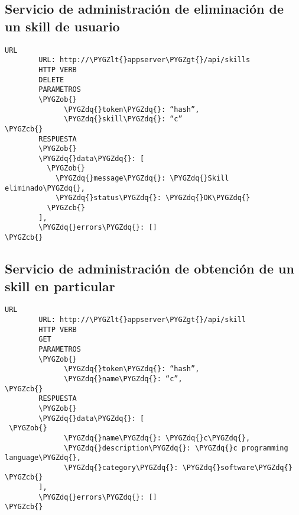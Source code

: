 \documentclass[a4paper,10pt,spanish]{sphinxmanual}
\def\PYGZob{\char`\{}
\def\PYGZcb{\char`\}}
\def\PYGZlt{\char`\<}
\def\PYGZgt{\char`\>}
\def\PYGZdq{\char`\"}
\begin{document}
\subsection{Servicio de administración de eliminación de un skill de usuario}
\label{apiRest:servicio-de-administracion-de-eliminacion-de-un-skill-de-usuario}
\begin{Verbatim}[commandchars=\\\{\}]
URL
        URL: http://\PYGZlt{}appserver\PYGZgt{}/api/skills
        HTTP VERB
        DELETE
        PARAMETROS
        \PYGZob{}
              \PYGZdq{}token\PYGZdq{}: “hash”,
              \PYGZdq{}skill\PYGZdq{}: “c”
\PYGZcb{}
        RESPUESTA
        \PYGZob{}
        \PYGZdq{}data\PYGZdq{}: [
          \PYGZob{}
            \PYGZdq{}message\PYGZdq{}: \PYGZdq{}Skill eliminado\PYGZdq{},
            \PYGZdq{}status\PYGZdq{}: \PYGZdq{}OK\PYGZdq{}
          \PYGZcb{}
        ],
        \PYGZdq{}errors\PYGZdq{}: []
\PYGZcb{}
\end{Verbatim}


\subsection{Servicio de administración de obtención de un skill en particular}
\label{apiRest:servicio-de-administracion-de-obtencion-de-un-skill-en-particular}
\begin{Verbatim}[commandchars=\\\{\}]
URL
        URL: http://\PYGZlt{}appserver\PYGZgt{}/api/skill
        HTTP VERB
        GET
        PARAMETROS
        \PYGZob{}
              \PYGZdq{}token\PYGZdq{}: “hash”,
              \PYGZdq{}name\PYGZdq{}: “c”,
\PYGZcb{}
        RESPUESTA
        \PYGZob{}
        \PYGZdq{}data\PYGZdq{}: [
 \PYGZob{}
              \PYGZdq{}name\PYGZdq{}: \PYGZdq{}c\PYGZdq{},
              \PYGZdq{}description\PYGZdq{}: \PYGZdq{}c programming language\PYGZdq{},
              \PYGZdq{}category\PYGZdq{}: \PYGZdq{}software\PYGZdq{}
\PYGZcb{}
        ],
        \PYGZdq{}errors\PYGZdq{}: []
\PYGZcb{}
\end{Verbatim}
\end{document}
